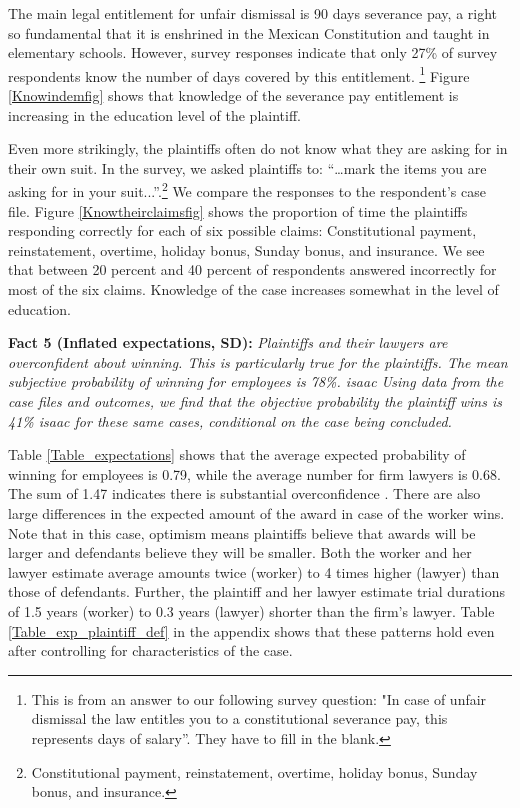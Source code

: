 \documentclass[11pt]{article}
\begin{document}
The main legal entitlement for unfair dismissal is 90 days severance pay, a right so fundamental that it is enshrined in the Mexican Constitution and taught in elementary schools. However, survey responses indicate that only 27\% of survey respondents know the number of days covered by this entitlement. \footnote{This is from an answer to our following survey question: "In case of unfair dismissal the law entitles you to a constitutional severance pay, this represents days of salary”. They have to fill in the blank.}  Figure \ref{Knowindemfig}  shows that knowledge of the severance pay entitlement is increasing in the education level of the plaintiff. 

Even more strikingly, the plaintiffs often do not know what they are asking for in their own suit. In the survey, we asked plaintiffs to: “…mark the items you are asking for in your suit...”.\footnote{Constitutional payment, reinstatement, overtime, holiday bonus, Sunday bonus, and insurance.}  We compare the responses to the respondent’s case file. Figure \ref{Knowtheirclaimsfig} shows the proportion of time the plaintiffs responding correctly for each of six possible claims: Constitutional payment, reinstatement, overtime, holiday bonus, Sunday bonus, and insurance. We see that between 20 percent and 40 percent of respondents answered incorrectly for most of the six claims. Knowledge of the case increases somewhat in the level of education.  

\vspace{.3in}
\begin{singlespace}
\textbf{Fact 5 (Inflated expectations, SD):} \emph{Plaintiffs and their lawyers are overconfident about winning. This is particularly true for the plaintiffs. The mean subjective probability of winning for employees is 78\%. isaac Using data from the case files and outcomes, we find that the objective probability the plaintiff wins is 41\% isaac for these same cases, conditional on the case being concluded.}
\end{singlespace}
\vspace{.1in}

Table \ref{Table_expectations} shows that the average expected probability of winning for employees is 0.79, while the average number for firm lawyers is 0.68.  The sum of 1.47 indicates there is substantial overconfidence \cite{Yildiz_CommonPrior}. There are also large differences in the expected amount of the award in case of the worker wins. Note that in this case, optimism means plaintiffs believe that awards will be larger and defendants believe they will be smaller. Both the worker and her lawyer estimate average amounts twice (worker) to 4 times higher (lawyer) than those of defendants. Further, the plaintiff and her lawyer estimate trial durations of 1.5 years (worker) to 0.3 years (lawyer) shorter than the firm’s lawyer.  Table \ref{Table_exp_plaintiff_def} in the appendix shows that these patterns hold even after controlling for characteristics of the case. 
\end{document}
